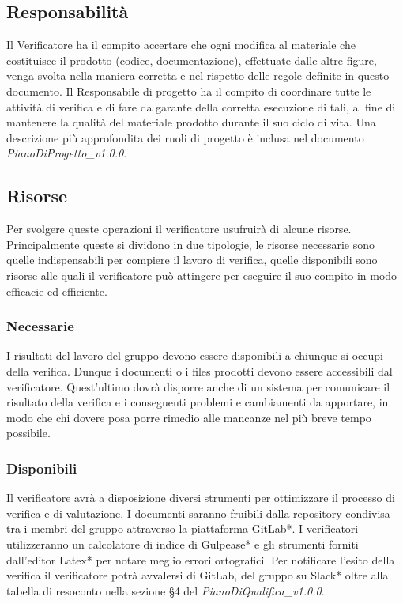 \subsection{Responsabilità}
Il Verificatore ha il compito accertare che ogni modifica al materiale che costituisce il prodotto (codice, documentazione), effettuate dalle altre figure, venga svolta nella maniera corretta e nel rispetto delle regole definite in questo documento. Il Responsabile di progetto ha il compito di coordinare tutte le attività di verifica e di fare da garante della corretta esecuzione di tali, al fine di mantenere la qualità del materiale prodotto durante il suo ciclo di vita. Una descrizione più approfondita dei ruoli di progetto è inclusa nel documento  \textit{PianoDiProgetto\_v1.0.0}.

\subsection{Risorse}
Per svolgere queste operazioni il verificatore usufruirà di alcune risorse. Principalmente queste si dividono in due tipologie, le risorse necessarie sono quelle indispensabili per compiere il lavoro di verifica, quelle disponibili sono risorse alle quali il verificatore può attingere per eseguire il suo compito in modo efficacie ed efficiente.

\subsubsection{Necessarie}
I risultati del lavoro del gruppo devono essere disponibili a chiunque si occupi della verifica. Dunque i documenti o i files prodotti devono essere accessibili dal verificatore. Quest'ultimo dovrà disporre anche di un sistema per comunicare il risultato della verifica e i conseguenti problemi e cambiamenti da apportare, in modo che chi dovere posa porre rimedio alle mancanze nel più breve tempo possibile.

\subsubsection{Disponibili}
Il verificatore avrà a disposizione diversi strumenti per ottimizzare il processo di verifica e di valutazione. I documenti saranno fruibili dalla repository condivisa tra i membri del gruppo attraverso la piattaforma GitLab*. I verificatori utilizzeranno un calcolatore di indice di Gulpease* e gli strumenti forniti dall'editor Latex* per notare meglio errori ortografici. Per notificare l'esito della verifica il verificatore potrà avvalersi di GitLab, del gruppo su Slack* oltre alla tabella di resoconto nella sezione §4 del \textit{PianoDiQualifica\_v1.0.0}.

